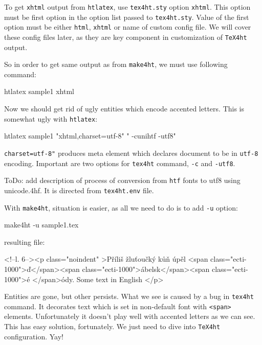 To get \texttt{xhtml} output from \texttt{htlatex}, use
\texttt{tex4ht.sty} option \texttt{xhtml}. This option must be first
option in the option list passed to \texttt{tex4ht.sty}. Value of the
first option must be either \texttt{html}, \texttt{xhtml} or name of
custom config file. We will cover these config files later, as they are
key component in customization of \texttt{TeX4ht} output.

So in order to get same output as from \texttt{make4ht}, we must use
following command:

\begin{shellcommand}
htlatex sample1 xhtml
\end{shellcommand}

Now we should get rid of ugly entities which encode accented letters.
This is somewhat ugly with \texttt{htlatex}:

\begin{shellcommand}
htlatex sample1 "xhtml,charset=utf-8" " -cunihtf -utf8"
\end{shellcommand}

\texttt{charset=utf-8"} produces meta element which declares document to
be in \texttt{utf-8} encoding. Important are two options for
\texttt{tex4ht} command, \texttt{-c} and \texttt{-utf8}.

ToDo: add description of process of conversion from \texttt{htf} fonts
to utf8 using unicode.4hf. It is directed from \texttt{tex4ht.env} file.

With \texttt{make4ht}, situation is easier, as all we need to do is to
add \texttt{-u} option:

\begin{shellcommand}
make4ht -u sample1.tex
\end{shellcommand}

resulting file:

\begin{htmlsource}
<!--l. 6--><p class="noindent" >Příliš žluťoučký kůň úpěl <span 
class="ecti-1000">ď</span><span 
class="ecti-1000">ábelsk</span><span 
class="ecti-1000">é </span>ódy. Some text in English
</p> 
\end{htmlsource}

Entities are gone, but other persists. What we see is caused by a bug in
\texttt{tex4ht} command. It decorates text which is set in non-default
font with \texttt{\textless{}span\textgreater{}} elements. Unfortunately
it doesn't play well with accented letters as we can see. This has easy
solution, fortunately. We just need to dive into \texttt{TeX4ht}
configuration. Yay!

